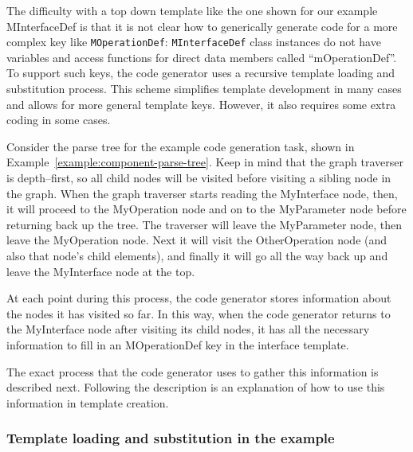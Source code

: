 The difficulty with a top down template like the one shown for our example
MInterfaceDef is that it is not clear how to generically generate code for a
more complex key like {\tt MOperationDef}: {\tt MInterfaceDef} class instances
do not have variables and access functions for direct data members called
``mOperationDef''. To support such keys, the code generator uses a recursive
template loading and substitution process. This scheme simplifies template
development in many cases and allows for more general template keys. However, it
also requires some extra coding in some cases.

Consider the parse tree for the example code generation task, shown in
Example~\ref{example:component-parse-tree}. Keep in mind that the graph
traverser is depth--first, so all child nodes will be visited before visiting a
sibling node in the graph. When the graph traverser starts reading the
MyInterface node, then, it will proceed to the MyOperation node and on to the
MyParameter node before returning back up the tree. The traverser will leave the
MyParameter node, then leave the MyOperation node. Next it will visit the
OtherOperation node (and also that node's child elements), and finally it will
go all the way back up and leave the MyInterface node at the top.

At each point during this process, the code generator stores information about
the nodes it has visited so far. In this way, when the code generator returns to
the MyInterface node after visiting its child nodes, it has all the necessary
information to fill in an MOperationDef key in the interface template.

The exact process that the code generator uses to gather this information is
described next. Following the description is an explanation of how to use this
information in template creation.

\subsubsection{Template loading and substitution in the example}

